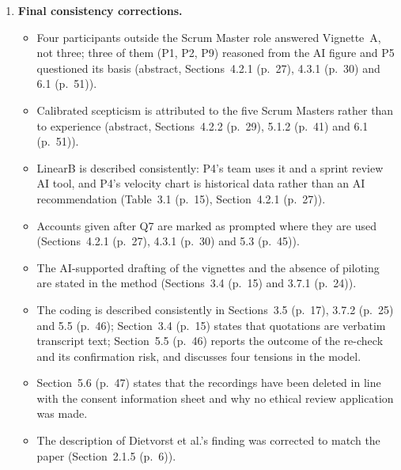 \documentclass[12pt,a4paper,twoside]{article}
\begin{document}
\begin{enumerate}
  \item \textbf{Final consistency corrections.}
        \begin{itemize}[noitemsep]
          \item Four participants outside the Scrum Master role answered Vignette~A, not three; three of them (P1, P2, P9) reasoned from the AI figure and P5 questioned its basis (abstract, Sections~4.2.1 (p.~27), 4.3.1 (p.~30) and 6.1 (p.~51)).
          \item Calibrated scepticism is attributed to the five Scrum Masters rather than to experience (abstract, Sections~4.2.2 (p.~29), 5.1.2 (p.~41) and 6.1 (p.~51)).
          \item LinearB is described consistently: P4's team uses it and a sprint review AI tool, and P4's velocity chart is historical data rather than an AI recommendation (Table~3.1 (p.~15), Section~4.2.1 (p.~27)).
          \item Accounts given after Q7 are marked as prompted where they are used (Sections~4.2.1 (p.~27), 4.3.1 (p.~30) and 5.3 (p.~45)).
          \item The AI-supported drafting of the vignettes and the absence of piloting are stated in the method (Sections~3.4 (p.~15) and 3.7.1 (p.~24)).
          \item The coding is described consistently in Sections~3.5 (p.~17), 3.7.2 (p.~25) and 5.5 (p.~46); Section~3.4 (p.~15) states that quotations are verbatim transcript text; Section~5.5 (p.~46) reports the outcome of the re-check and its confirmation risk, and discusses four tensions in the model.
          \item Section~5.6 (p.~47) states that the recordings have been deleted in line with the consent information sheet and why no ethical review application was made.
          \item The description of Dietvorst et al.'s finding was corrected to match the paper (Section~2.1.5 (p.~6)).
        \end{itemize}
\end{enumerate}
\end{document}
